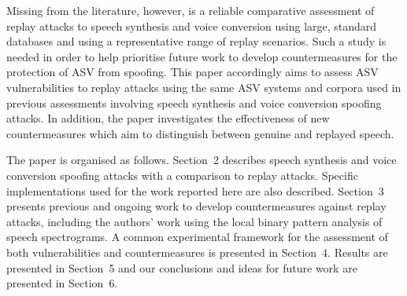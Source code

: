 
Missing from the literature, however, is a reliable comparative assessment 
of replay attacks to speech synthesis and voice conversion using large, 
standard databases and using a representative range of replay scenarios. 
Such a study is needed in order to help prioritise future work to develop
countermeasures for the protection of ASV from spoofing.
This paper accordingly aims to assess ASV vulnerabilities 
to replay attacks using the same ASV systems and corpora used in 
previous assessments involving speech synthesis and voice conversion  
spoofing attacks.  In addition, the paper investigates the effectiveness of 
new countermeasures which aim to distinguish between genuine and replayed speech.  

The paper is organised as follows.  Section~2 describes speech synthesis and voice conversion spoofing attacks with a comparison to replay attacks. Specific implementations used for the work reported here are also described. Section~3 presents previous and ongoing work to develop countermeasures against replay attacks, including the authors' work using the local binary pattern analysis of speech spectrograms.  A common experimental framework for the assessment of both vulnerabilities and countermeasures is presented in Section~4. Results are presented in Section~5 and our conclusions and ideas for future work are presented in Section~6.
